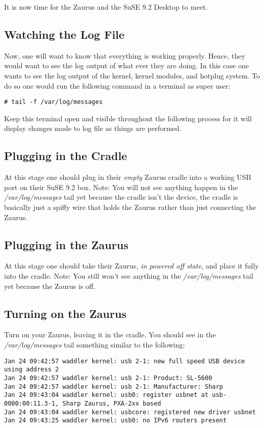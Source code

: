 \documentclass{article}
\begin{document}
It is now time for the Zaurus and the SuSE 9.2 Desktop to meet.

\subsection{Watching the Log File}

Now, one will want to know that everything is working properly. Hence, they
would want to see the log output of what ever they are doing. In this case one
wants to see the log output of the kernel, kernel modules, and hotplug
system. To do so one would run the following command in a terminal as super
user:

\begin{verbatim}
# tail -f /var/log/messages
\end{verbatim}

Keep this terminal open and visible throughout the following process for it
will display changes made to log file as things are performed.

\subsection{Plugging in the Cradle}

At this stage one should plug in their \emph{empty} Zaurus cradle into a
working USB port on their SuSE 9.2 box. Note: You will not see anything happen
in the \emph{/var/log/messages} tail yet because the cradle isn't the device,
the cradle is basically just a spiffy wire that holds the
Zaurus rather than just connecting the Zaurus.

\subsection{Plugging in the Zaurus}

At this stage one should take their Zaurus, \emph{in powered off state}, and
place it fully into the cradle. Note: You still won't see anything in the
\emph{/var/log/messages} tail yet because the Zaurus is off.

\subsection{Turning on the Zaurus}

Turn on your Zaurus, leaving it in the cradle. You should see in the
\emph{/var/log/messages} tail something similar to the following:

\begin{verbatim}
Jan 24 09:42:57 waddler kernel: usb 2-1: new full speed USB device using address 2
Jan 24 09:42:57 waddler kernel: usb 2-1: Product: SL-5600
Jan 24 09:42:57 waddler kernel: usb 2-1: Manufacturer: Sharp
Jan 24 09:43:04 waddler kernel: usb0: register usbnet at usb-0000:00:11.3-1, Sharp Zaurus, PXA-2xx based
Jan 24 09:43:04 waddler kernel: usbcore: registered new driver usbnet
Jan 24 09:43:25 waddler kernel: usb0: no IPv6 routers present
\end{verbatim}
\end{document}
